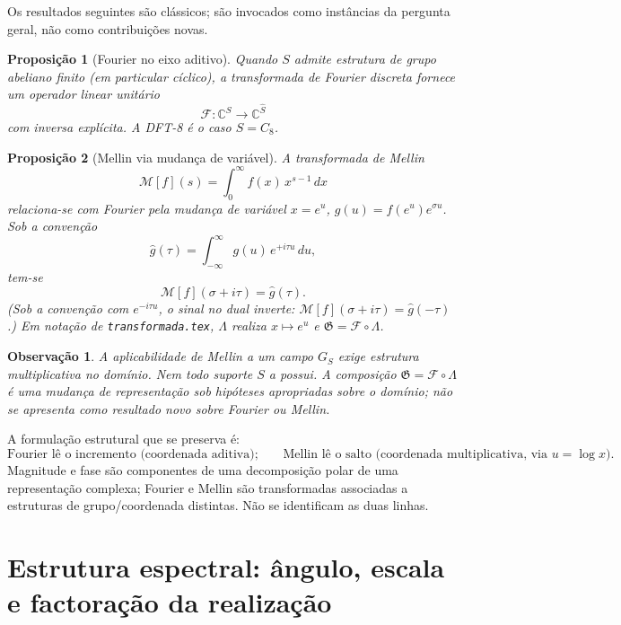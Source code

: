 \documentclass[11pt,a4paper]{article}
\newtheorem{proposicao}{Proposição}
\newtheorem{observacao}{Observação}
\begin{document}
Os resultados seguintes são clássicos; são invocados como instâncias da pergunta geral, não como contribuições novas.

\begin{proposicao}[Fourier no eixo aditivo]
Quando \(S\) admite estrutura de grupo abeliano finito (em particular cíclico), a transformada de Fourier discreta fornece um operador linear unitário
\[
\mathcal F\colon\mathbb C^S\to\mathbb C^{\widehat S}
\]
com inversa explícita. A DFT-8 é o caso \(S=C_8\).
\end{proposicao}

\begin{proposicao}[Mellin via mudança de variável]
A transformada de Mellin
\[
\mathcal M[f](s)=\int_0^\infty f(x)\,x^{s-1}\,dx
\]
relaciona-se com Fourier pela mudança de variável \(x=e^u\), \(g(u)=f(e^u)e^{\sigma u}\). Sob a convenção
\[
\widehat g(\tau)=\int_{-\infty}^{\infty}g(u)\,e^{+i\tau u}\,du,
\]
tem-se
\[
\mathcal M[f](\sigma+i\tau)=\widehat g(\tau).
\]
(Sob a convenção com \(e^{-i\tau u}\), o sinal no dual inverte: \(\mathcal M[f](\sigma+i\tau)=\widehat g(-\tau)\).) Em notação de \texttt{transformada.tex}, \(\Lambda\) realiza \(x\mapsto e^u\) e \(\mathfrak G=\mathcal F\circ\Lambda\).
\end{proposicao}

\begin{observacao}
A aplicabilidade de Mellin a um campo \(G_S\) exige estrutura multiplicativa no domínio. Nem todo suporte \(S\) a possui. A composição \(\mathfrak G=\mathcal F\circ\Lambda\) é uma mudança de representação sob hipóteses apropriadas sobre o domínio; não se apresenta como resultado novo sobre Fourier ou Mellin.
\end{observacao}

A formulação estrutural que se preserva é:
\[
\boxed{\text{Fourier lê o incremento (coordenada aditiva);}\qquad
\text{Mellin lê o salto (coordenada multiplicativa, via }u=\log x\text{).}}
\]
Magnitude e fase são componentes de uma decomposição polar de uma representação complexa; Fourier e Mellin são transformadas associadas a estruturas de grupo/coordenada distintas. Não se identificam as duas linhas.

\section{Estrutura espectral: ângulo, escala e factoração da realização}
\label{sec:espectro-angulo-escala}
\end{document}
